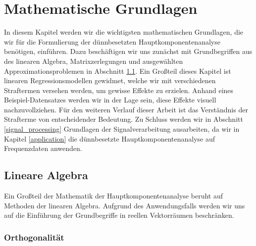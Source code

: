 \chapter{Mathematische Grundlagen}

\label{fundamentals}

In diesem Kapitel werden wir die wichtigsten mathematischen Grundlagen, die wir für die Formulierung der dünnbesetzten Hauptkomponentenanalyse benötigen, einführen. Dazu beschäftigen wir uns zunächst mit Grundbegriffen aus des linearen Algebra, Matrixzerlegungen und ausgewählten Approximationsproblemen in Abschnitt \ref{linear_algebra}. Ein Großteil dieses Kapitel ist linearen Regressionsmodellen gewidmet, welche wir mit verschiedenen Straftermen versehen werden, um gewisse Effekte zu erzielen. Anhand eines Beispiel-Datensatzes werden wir in der Lage sein, diese Effekte visuell nachzuvollziehen. Für den weiteren Verlauf dieser Arbeit ist das Verständnis der Strafterme von entscheidender Bedeutung. Zu Schluss werden wir in Abschnitt \ref{signal_processing} Grundlagen der Signalverarbeitung ausarbeiten, da wir in Kapitel \ref{application} die dünnbesetzte Hauptkomponentenanalyse auf Frequenzdaten anwenden.






\section{Lineare Algebra}
\label{linear_algebra}

Ein Großteil der Mathematik der Hauptkomponentenanalyse beruht auf Methoden der linearen Algebra. Aufgrund des Anwendungsfalls werden wir uns auf die Einführung der Grundbegriffe in reellen Vektorräumen beschränken.

\subsection{Orthogonalität}
\label{orthogonality}

